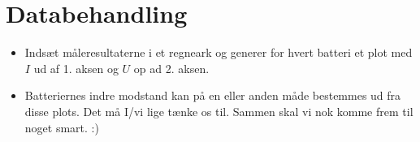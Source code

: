 \documentclass[a4paper, 12pt]{article}
\begin{document}
\section*{Databehandling}
\label{sec:orga8edf8d}
\begin{itemize}
\item Indsæt måleresultaterne i et regneark og generer for hvert batteri et plot med \(I\) ud af 1. aksen og \(U\) op ad 2. aksen.
\item Batteriernes indre modstand kan på en eller anden måde bestemmes ud fra disse plots. Det må I/vi lige tænke os til. Sammen skal vi nok komme frem til noget smart. :)
\end{itemize}
\end{document}
